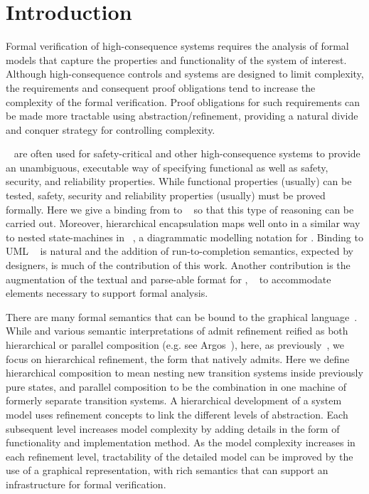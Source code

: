 
\section{Introduction}
\label{sec:introduction}

Formal verification of high-consequence systems requires the analysis
of formal models that capture the properties and functionality of the
system of interest. Although high-consequence controls and systems are
designed to limit complexity, the requirements and consequent proof
obligations tend to increase the complexity of the formal verification.  
Proof obligations for such requirements can be made more tractable using
abstraction/refinement, providing a natural divide and conquer
strategy for controlling complexity.

\Statecharts~\cite{Harel} are often used for safety-critical 
and other high-consequence systems to provide an unambiguous, executable way
of specifying functional as well as safety, security, and reliability
properties.  While functional properties (usually) can be tested,
safety, security and reliability properties (usually) must be proved
formally.  Here we give a binding from \Statecharts to \EventB~\cite{abrial10:_model_event_b} so that
this type of reasoning can be carried out.  Moreover, hierarchical
encapsulation maps well onto \Statecharts in a similar way to nested state-machines in \iUMLB~\cite{snook14:_b_statem,Snook2006,Snook12:FMCO}, a diagrammatic modelling notation for \EventB.
Binding \iUMLB to UML \Statecharts~\cite{Rumbaugh2004} is natural and the
addition of run-to-completion semantics, expected by \Statechart
designers, is much of the contribution of this work.  Another
contribution is the augmentation of the textual and parse-able format
for \Statecharts, \SCXML~\cite{scxmlwebsite} to accommodate elements necessary to support formal
analysis. 

There are many formal semantics that can be bound to 
 the \Statechart graphical language~\cite{Eshuis_2009}. While \Statecharts and various semantic interpretations of
\Statecharts admit refinement reified as both hierarchical or parallel
composition (e.g. see Argos~\cite{Maraninchi91theargos}), here, as
previously~\cite{snook14:_b_statem}, we focus on hierarchical
refinement, the form that \EventB natively admits.  Here we define
hierarchical composition to mean nesting new transition systems inside
previously pure states, and parallel composition to be the combination
in one machine of formerly separate transition systems.
A hierarchical development of a system model uses refinement
concepts to link the different levels of abstraction. Each subsequent
level increases model complexity by adding details in the form of
functionality and implementation method. As the model complexity
increases in each refinement level, tractability of the detailed model
can be improved by the use of a graphical representation, with rich
semantics that can support an infrastructure for formal verification.



